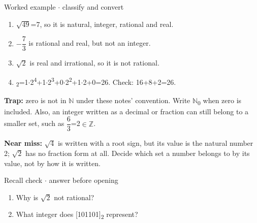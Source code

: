 \documentclass[11pt]{article}
\begin{document}
\begin{keepsection}
\begin{workedbox}{Worked example \ensuremath{\cdot} classify and convert}
\begin{enumerate}
\item \ensuremath{\sqrt{49}}=7, so it is natural, integer, rational and real.
\item \ensuremath{-}{\small\ensuremath{\dfrac{7}{3}}} is rational and real, but not an integer.
\item \ensuremath{\sqrt{2}} is real and irrational, so it is not rational.
\item [11010]\textsubscript{2}=1\ensuremath{\cdot}2\textsuperscript{4}+1\ensuremath{\cdot}2\textsuperscript{3}+0\ensuremath{\cdot}2\textsuperscript{2}+1\ensuremath{\cdot}2+0=26. Check: 16+8+2=26.
\end{enumerate}
\end{workedbox}

\begin{notebox}\textbf{Trap:} zero is not in \ensuremath{\mathbb{N}} under these notes’ convention. Write \ensuremath{\mathbb{N}}\textsubscript{0} when zero is included. Also, an integer written as a decimal or fraction can still belong to a smaller set, such as {\small\ensuremath{\dfrac{6}{3}}}=2\ensuremath{\in}\ensuremath{\mathbb{Z}}.\end{notebox}

\begin{notebox}\textbf{Near miss:} \ensuremath{\sqrt{4}} is written with a root sign, but its value is the natural number 2; \ensuremath{\sqrt{2}} has no fraction form at all. Decide which set a number belongs to by its value, not by how it is written.\end{notebox}

\begin{recallbox}{Recall check \ensuremath{\cdot} answer before opening}
\begin{enumerate}
\item Why is \ensuremath{\sqrt{2}} not rational?
\item What integer does [101101]\textsubscript{2} represent?
\end{enumerate}

\end{recallbox}
\end{keepsection}
\end{document}
